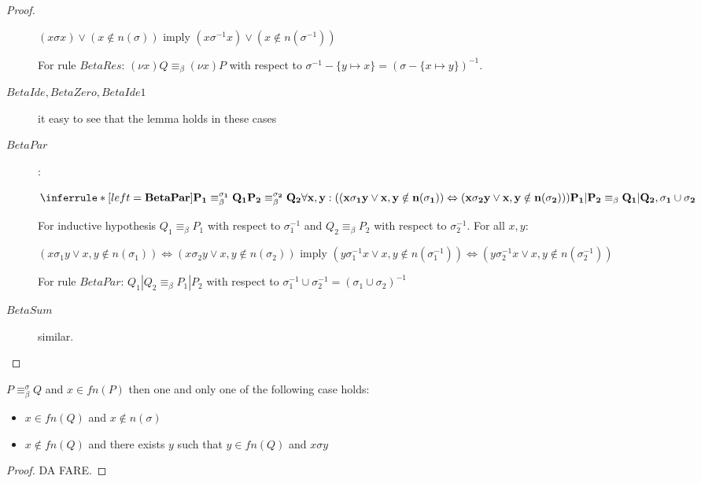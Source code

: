 \begin{lemma}
\begin{proof}
\begin{description}
	\begin{center}
	  $(x \sigma x) \vee (x\notin n(\sigma))$ imply $(x \sigma^{-1} x) \vee (x\notin n(\sigma^{-1}))$
	\end{center}
	For rule $BetaRes$: $(\nu x)Q\equiv_{\beta}(\nu x)P$ with respect to $\sigma^{-1} - \{y\mapsto x\}=(\sigma - \{x\mapsto y\})^{-1}$.
      \item[$BetaIde, BetaZero, BetaIde1$] it easy to see that the lemma holds in these cases
      \item[$BetaPar$]:
	\begin{center}
	  $\inferrule*[left=\bf{BetaPar}]{
	      P_{1}\equiv_{\beta}^{\sigma_{1}}Q_{1}
	    \\
	      P_{2}\equiv_{\beta}^{\sigma_{2}}Q_{2}
	    \\
	      \forall x,y: ((x\sigma_{1}y \vee x,y\notin n(\sigma_{1})) \Leftrightarrow (x\sigma_{2}y \vee x,y\notin n(\sigma_{2})))
	  }{
	      P_{1}|P_{2}\equiv_{\beta}Q_{1}|Q_{2},
	    \\
	      \sigma_{1} \cup \sigma_{2}
	  }$
	\end{center}
	For inductive hypothesis $Q_{1}\equiv_{\beta}P_{1}$ with respect to $\sigma_{1}^{-1}$ and $Q_{2}\equiv_{\beta}P_{2}$ with respect to $\sigma_{2}^{-1}$. For all $x,y$:
	\begin{center}
	  $(x\sigma_{1}y \vee x,y\notin n(\sigma_{1})) \Leftrightarrow (x\sigma_{2}y \vee x,y\notin n(\sigma_{2}))$ imply $(y\sigma_{1}^{-1}x \vee x,y\notin n(\sigma_{1}^{-1})) \Leftrightarrow (y\sigma_{2}^{-1}x \vee x,y\notin n(\sigma_{2}^{-1}))$
	\end{center}
	For rule $BetaPar$: $Q_{1}|Q_{2}\equiv_{\beta}P_{1}|P_{2}$ with respect to $\sigma_{1}^{-1}\cup \sigma_{2}^{-1}=(\sigma_{1} \cup \sigma_{2})^{-1}$
      \item[$BetaSum$] similar.
    \end{description}
  \end{proof}
\end{lemma}

\begin{lemma}\label{freeNamesAndBetaEquivalence1}
  $P\equiv_{\beta}^{\sigma}Q$ and $x\in fn(P)$ then one and only one of the following case holds: 
  \begin{itemize}
    \item 
      $x\in fn(Q)$ and $x\notin n(\sigma)$ 
    \item
      $x\notin fn(Q)$ and there exists $y$ such that $y\in fn(Q)$ and $x\sigma y$
  \end{itemize}
  \begin{proof}
    DA FARE.
  \end{proof}
\end{lemma}

